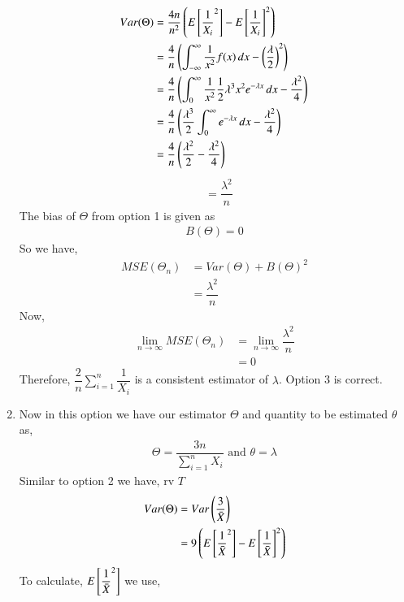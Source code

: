 \documentclass[journal,12pt,twocolumn]{IEEEtran}
\theoremstyle{definition}
\begin{document}
\begin{enumerate}
\begin{align}
 Var(\Theta)   & = \dfrac{4n}{n^2} \left(E  \left[ {\dfrac{1}{X_i}}^2  \right] - {E  \left[ {\dfrac{1}{X_i}}  \right]}^2 \right) \\
    & = \dfrac{4}{n} \left( \int_{-\infty}^{\infty} \dfrac{1}{x^2} f(x)\,dx  - \left(\dfrac{\lambda}{2}\right)^2 \right) \\
    & =  \dfrac{4}{n} \left( \int_{0}^{\infty} \dfrac{1}{x^2}  \dfrac{1}{2} \lambda^3x^2e^{-\lambda x} \,dx  - {\dfrac{\lambda^2}{4}} \right) \\
      & =  \dfrac{4}{n} \left( \dfrac{\lambda^3}{2}\int_{0}^{\infty} e^{-\lambda x} \,dx  - {\dfrac{\lambda^2}{4}} \right) \\ 
    & =  \dfrac{4}{n} \left( {\dfrac{\lambda^2}{2}} - {\dfrac{\lambda^2}{4}} \right) 
    \end{align}
    \begin{align} 
    &= \dfrac{\lambda^2}{n}
\end{align}
The bias of $ \Theta $ from option 1 is given as
\begin{align}
    B(\Theta) = 0
\end{align}
So we have,
\begin{align}
    MSE(\Theta_n) &= Var(\Theta) + B(\Theta)^2 \\
    &= \dfrac{\lambda^2}{n}
\end{align}
Now,
\begin{align}
     \lim_{n\to\infty} MSE( \Theta_n) &=    \lim_{n\to\infty} \dfrac{\lambda^2}{n} \\
      &= 0
\end{align}
Therefore, $\dfrac{2}{n} \sum_{i=1}^{n} \dfrac{1}{X_i} $ is a consistent estimator of $ \lambda$. 
Option 3 is correct. \\
\item 
 Now in this option we have our estimator $ \Theta$ and quantity to be estimated $ \theta $ as,
 \begin{align}
     \Theta = \dfrac{3n}{\sum_{i=1}^{n} X_i } \text{  and  }
     \theta = \lambda
 \end{align}
 Similar to option 2 we have, rv $ T$
 \begin{align}
     Var(\Theta)&= Var\left(\dfrac{3}{\Bar{X}}\right) \\
     &= 9 \left( E \left[   {\dfrac{1}{\Bar{X}}}^2  \right] - { E \left[   \dfrac{1}{\Bar{X}}  \right]}^2\right)
 \end{align}
 To calculate, $E \left[   {\dfrac{1}{\Bar{X}}}^2  \right] $ we use,
 \begin{align}

\end{align}
\end{enumerate}
\end{document}
